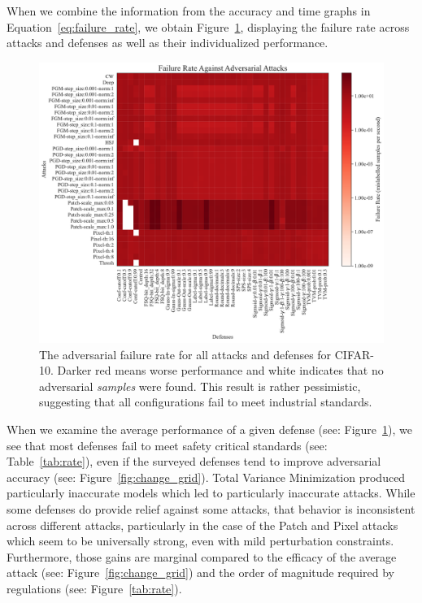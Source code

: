\documentclass[journal]{IEEEtran}
\newcommand{\cm}[1]{\textit{{\color{blue}#1}}}
\begin{document}
When we combine the information from the accuracy and time graphs in Equation~\ref{eq:failure_rate}, we obtain Figure~\ref{fig:rate_grid}, displaying the failure rate across attacks and defenses as well as their individualized performance.  
\begin{figure}[!hptb]
    {\centering
    \includegraphics[trim={0 0.85em 0 0.35em},clip,height=0.6\textwidth]{images/cifar-10/rate_grid.pdf}
    \vspace{-0.75em}
    \caption{The adversarial failure rate for all attacks and defenses for CIFAR-10. Darker red means worse performance and white indicates that no adversarial \cm{samples} were found. This result is rather pessimistic, suggesting that all configurations fail to meet industrial standards.}
    \label{fig:rate_grid}
    } %
\end{figure}
When we examine the average performance of a given defense (see: Figure~\ref{fig:rate_grid}), we see that most defenses fail to meet safety critical standards (see: Table~\ref{tab:rate}), even if the surveyed defenses tend to improve adversarial accuracy (see: Figure~\ref{fig:change_grid}). Total Variance Minimization produced particularly inaccurate models which led to particularly inaccurate attacks.  While some defenses do provide relief against some attacks, that behavior is inconsistent across different attacks, particularly in the case of the Patch and Pixel attacks which seem to be universally strong, even with mild perturbation constraints. Furthermore, those gains are marginal compared to the efficacy of the average attack (see: Figure~\ref{fig:change_grid}) and the order of magnitude required by regulations (see: Figure~\ref{tab:rate}).
\end{document}
